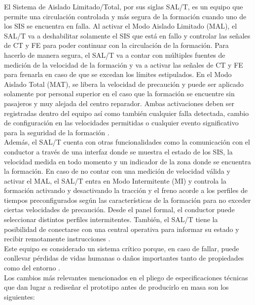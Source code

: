 El Sistema de Aislado Limitado/Total, por sus siglas SAL/T, es un equipo que permite una circulación controlada y más segura de la formación cuando uno de los SIS se encuentra en falla. Al activar el Modo Aislado Limitado (MAL), el SAL/T va a deshabilitar solamente el SIS que está en fallo y controlar las señales de CT y FE para poder continuar con la circulación de la formación. Para hacerlo de manera segura, el SAL/T va a contar con múltiples fuentes de medición de la velocidad de la formación y va a activar las señales de CT y FE para frenarla en caso de que se excedan los límites estipulados. En el Modo Aislado Total (MAT), se libera la velocidad de precaución y puede ser aplicado solamente por personal superior en el caso que la formación se encuentre sin pasajeros y muy alejada del centro reparador. Ambas activaciones deben ser registradas dentro del equipo así como también cualquier falla detectada, cambio de configuración en las velocidades permitidas o cualquier evento significativo para la seguridad de la formación \cite{salt_paper}.\\

Además, el SAL/T cuenta con otras funcionalidades como la comunicación con el conductor a través de una interfaz donde se muestra el estado de los SIS, la velocidad medida en todo momento y un indicador de la zona donde se encuentra la formación. En caso de no contar con una medición de velocidad válida y activar el MAL, el SAL/T entra en Modo Intermitente (MI) y controla la formación activando y desactivando la tracción y el freno acorde a los perfiles de tiempos preconfigurados según las características de la formación para no exceder ciertas velocidades de precaución. Desde el panel formal, el conductor puede seleccionar distintos perfiles intermitentes.  También, el SAL/T tiene la posibilidad de conectarse con una central operativa para informar su estado y recibir remotamente instrucciones \cite{salt_paper}. \\

Este equipo es considerado un sistema crítico porque, en caso de fallar, puede conllevar pérdidas de vidas humanas o daños importantes tanto de propiedades como del entorno \cite{norma_61508}. \\


Los cambios más relevantes mencionados en el pliego de especificaciones técnicas que dan lugar a rediseñar el prototipo antes de producirlo en masa son los siguientes:

